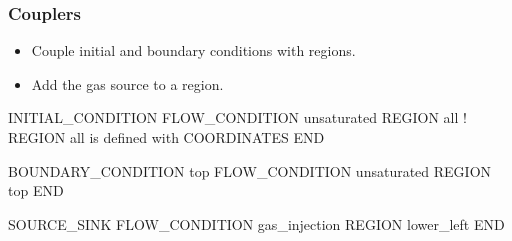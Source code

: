 \documentclass{beamer}
\newcommand\bluecomment[1]{{{\color{blue} #1}}}
\newcommand\greencomment[1]{{{\color{green} #1}}}
\begin{document}
\begin{frame}[fragile]\frametitle{Couplers}

\begin{itemize}
  \item Couple initial and boundary conditions with regions.
  \item Add the gas source to a region.
\end{itemize}

\begin{semiverbatim}

INITIAL_CONDITION
  FLOW_CONDITION unsaturated
  REGION all \bluecomment{! REGION \greencomment{all} is defined with COORDINATES}
END

BOUNDARY_CONDITION top
  FLOW_CONDITION unsaturated
  REGION top
END

SOURCE_SINK
  FLOW_CONDITION gas_injection
  REGION lower_left
END
\end{semiverbatim}

\end{frame}


\end{document}
